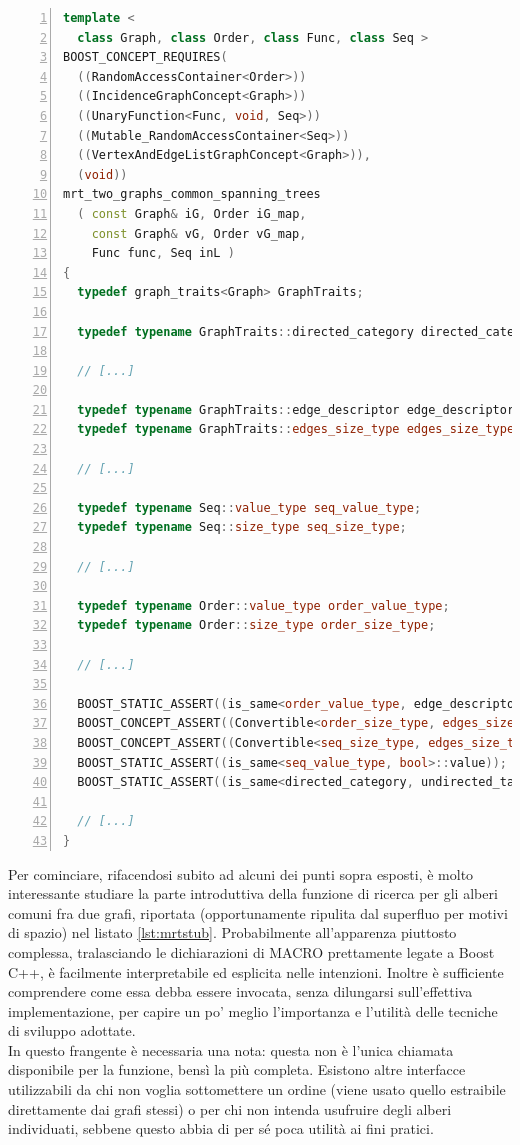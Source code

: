 \begin{lstlisting}[basicstyle=\small,language=C++,caption={Parte della funzione \textit{mrt}},float,captionpos=b,label={lst:mrtstub},frame=lines,numbers=left]
template <
  class Graph, class Order, class Func, class Seq >
BOOST_CONCEPT_REQUIRES(
  ((RandomAccessContainer<Order>))
  ((IncidenceGraphConcept<Graph>))
  ((UnaryFunction<Func, void, Seq>))
  ((Mutable_RandomAccessContainer<Seq>))
  ((VertexAndEdgeListGraphConcept<Graph>)),
  (void))
mrt_two_graphs_common_spanning_trees
  ( const Graph& iG, Order iG_map,
    const Graph& vG, Order vG_map,
    Func func, Seq inL )
{
  typedef graph_traits<Graph> GraphTraits;

  typedef typename GraphTraits::directed_category directed_category;

  // [...]

  typedef typename GraphTraits::edge_descriptor edge_descriptor;
  typedef typename GraphTraits::edges_size_type edges_size_type;

  // [...]

  typedef typename Seq::value_type seq_value_type;
  typedef typename Seq::size_type seq_size_type;

  // [...]

  typedef typename Order::value_type order_value_type;
  typedef typename Order::size_type order_size_type;

  // [...]

  BOOST_STATIC_ASSERT((is_same<order_value_type, edge_descriptor>::value));
  BOOST_CONCEPT_ASSERT((Convertible<order_size_type, edges_size_type>));
  BOOST_CONCEPT_ASSERT((Convertible<seq_size_type, edges_size_type>));
  BOOST_STATIC_ASSERT((is_same<seq_value_type, bool>::value));
  BOOST_STATIC_ASSERT((is_same<directed_category, undirected_tag>::value));

  // [...]
}
\end{lstlisting}

  Per cominciare, rifacendosi subito ad alcuni dei punti sopra esposti, è molto interessante studiare la parte introduttiva della funzione di ricerca per gli alberi comuni fra due grafi, riportata (opportunamente ripulita dal superfluo per motivi di spazio) nel listato \ref{lst:mrtstub}. Probabilmente all'apparenza piuttosto complessa, tralasciando le dichiarazioni di MACRO prettamente legate a Boost C++, è facilmente interpretabile ed esplicita nelle intenzioni. Inoltre è sufficiente comprendere come essa debba essere invocata, senza dilungarsi sull'effettiva implementazione, per capire un po' meglio l'importanza e l'utilità delle tecniche di sviluppo adottate.\\
  In questo frangente è necessaria una nota: questa non è l'unica chiamata disponibile per la funzione, bensì la più completa. Esistono altre interfacce utilizzabili da chi non voglia sottomettere un ordine (viene usato quello estraibile direttamente dai grafi stessi) o per chi non intenda usufruire degli alberi individuati, sebbene questo abbia di per sé poca utilità ai fini pratici.

